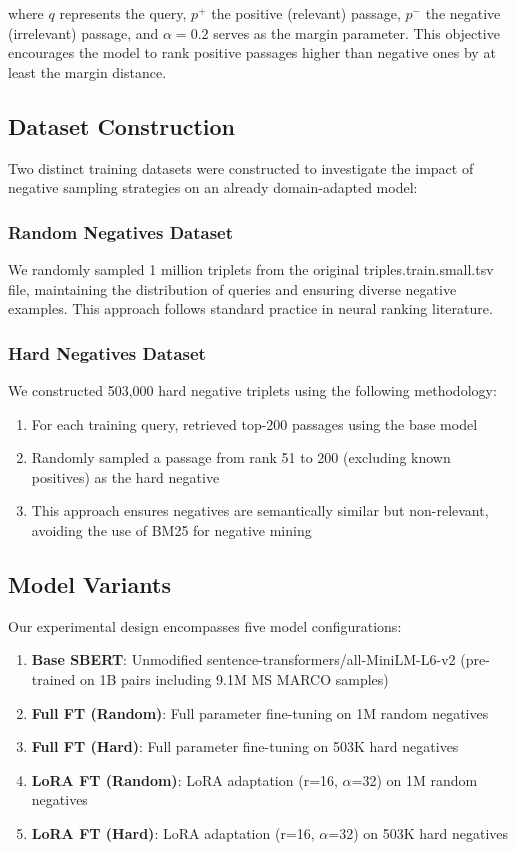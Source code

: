 \documentclass[conference]{IEEEtran}
\begin{document}
where $q$ represents the query, $p^+$ the positive (relevant) passage, $p^-$ the negative (irrelevant) passage, and $\alpha=0.2$ serves as the margin parameter. This objective encourages the model to rank positive passages higher than negative ones by at least the margin distance.

\subsection{Dataset Construction}
Two distinct training datasets were constructed to investigate the impact of negative sampling strategies on an already domain-adapted model:

\subsubsection{Random Negatives Dataset}
We randomly sampled 1 million triplets from the original triples.train.small.tsv file, maintaining the distribution of queries and ensuring diverse negative examples. This approach follows standard practice in neural ranking literature.

\subsubsection{Hard Negatives Dataset}
We constructed 503,000 hard negative triplets using the following methodology:
\begin{enumerate}
\item For each training query, retrieved top-200 passages using the base model
\item Randomly sampled a passage from rank 51 to 200 (excluding known positives) as the hard negative
\item This approach ensures negatives are semantically similar but non-relevant, avoiding the use of BM25 \cite{robertson2009probabilistic} for negative mining
\end{enumerate}

\subsection{Model Variants}
Our experimental design encompasses five model configurations:

\begin{enumerate}
\item \textbf{Base SBERT}: Unmodified sentence-transformers/all-MiniLM-L6-v2 (pre-trained on 1B pairs including 9.1M MS MARCO samples)
\item \textbf{Full FT (Random)}: Full parameter fine-tuning on 1M random negatives
\item \textbf{Full FT (Hard)}: Full parameter fine-tuning on 503K hard negatives
\item \textbf{LoRA FT (Random)}: LoRA adaptation (r=16, $\alpha$=32) on 1M random negatives
\item \textbf{LoRA FT (Hard)}: LoRA adaptation (r=16, $\alpha$=32) on 503K hard negatives
\end{enumerate}
\end{document}
